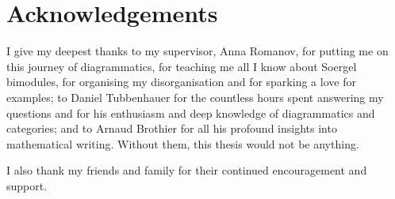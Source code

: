 \chapter*{Acknowledgements}
\thispagestyle{empty}

I give my deepest thanks to my supervisor, Anna Romanov, for putting me on this journey of diagrammatics, for teaching me all I know about Soergel bimodules, for organising my disorganisation and for sparking a love for examples; to Daniel Tubbenhauer for the countless hours spent answering my questions and for his enthusiasm and deep knowledge of diagrammatics and categories; and to Arnaud Brothier for all his profound insights into mathematical writing. Without them, this thesis would not be anything.

I also thank my friends and family for their continued encouragement and support.

